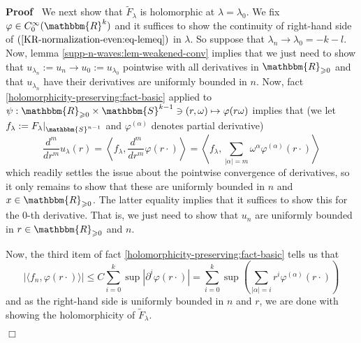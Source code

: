 \documentclass{article}
\newcommand{\assign}{:=}
\newenvironment{proof}{\noindent\textbf{Proof\ }}{\hspace*{\fill}$\Box$\medskip}
\numberwithin{definition}{section}
\numberwithin{lemma}{section}
\numberwithin{proposition}{section}
{\theorembodyfont{\rmfamily}\newtheorem{remark}{Remark}
\numberwithin{remark}{section}
}
\begin{document}
\begin{proof}
  We next show that $\tilde{F}_{\lambda}$ is holomorphic at $\lambda =
  \lambda_0$. We fix $\varphi \in C^{\infty}_0 ( \mathbbm{R}^k)$ and it
  suffices to show the continuity of right-hand side of $(
  \ref{KR-normalization-even:eq-lemeq})$ in $\lambda$. So suppose that
  $\lambda_n \rightarrow \lambda_0 = - k - l$. Now, lemma
  \ref{supp-n-waves:lem-weakened-conv} implies that we just need to show that
  $u_{\lambda_n} \assign u_n \rightarrow u_0 \assign u_{\lambda_0}$ pointwise
  with all derivatives in $\mathbbm{R}_{\geqslant 0}$ and that $u_{\lambda_n}$
  have their derivatives are uniformly bounded in $n$. Now, fact
  \ref{holomorphicity-preserving:fact-basic} applied to $\psi :
  \mathbbm{R}_{\geqslant 0} \times \mathbbm{S}^{k - 1} \ni ( r, \omega)
  \mapsto \varphi ( r \omega)$ implies that (we let $f_{\lambda} \assign
  F_{\lambda} |_{\mathbbm{S}^{n - 1}}$ and $\varphi^{( \alpha)}$ denotes
  partial derivative)
  \[ \frac{d^m}{d r^m} u_{\lambda} ( r) = \left\langle f_{\lambda},
     \frac{d^m}{d r^m} \varphi ( r \cdot) \right\rangle = \left\langle
     f_{\lambda}, \sum_{| \alpha | = m} \omega^{\alpha} \varphi^{( \alpha)} (
     r \cdot) \right\rangle \]
  which readily settles the issue about the pointwise convergence of
  derivatives, so it only remains to show that these are uniformly bounded in
  $n$ and $x \in \mathbbm{R}_{\geqslant 0}$. The latter equality implies that
  it suffices to show this for the 0-th derivative. That is, we just need to
  show that $u_n$ are uniformly bounded in $r \in \mathbbm{R}_{\geqslant 0}$
  and $n$.
  
  Now, the third item of fact \ref{holomorphicity-preserving:fact-basic} tells
  us that
  \[ | \langle f_n, \varphi ( r \cdot) \rangle | \leqslant C \sum_{i = 0}^k
     \sup | \partial^i \varphi ( r \cdot) | = \sum_{i = 0}^k \sup \left(
     \sum_{| \alpha | = i} r^i \varphi^{( \alpha)} ( r \cdot) \right) \]
  and as the right-hand side is uniformly bounded in $n$ and $r$, we are done
  with showing the holomorphicity of $\tilde{F}_{\lambda}$.
  

\end{proof}
\end{document}
